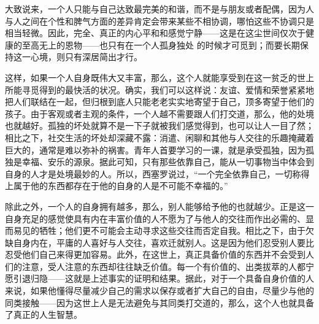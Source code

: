 \documentclass[11pt,oneside]{article}
\begin{document}
\begin{common-format}
大致说来，一个人只能与自己达致最完美的和谐，而不是与朋友或者配偶，因为人与人之间在个性和脾气方面的差异肯定会带来某些不相协调，哪怕这些不协调只是相当轻微。因此，完全、真正的内心平和和感觉宁静——这是在这尘世间仅次于健康的至高无上的恩物——也只有在一个人孤身独处 的时候才可觅到；而要长期保持这一心境，则只有深居简出才行。 

这样，如果一个人自身既伟大又丰富，那么，这个人就能享受到在这一贫乏的世上所能寻觅得到的最快活的状况。确实，我们可以这样说：友谊、爱情和荣誉紧紧地把人们联结在一起，但归根到底人只能老老实实地寄望于自己，顶多寄望于他们的孩子。由于客观或者主观的条件，一个人越不需要跟人们打交道，那么，他的处境也就越好。孤独的坏处就算不是一下子就被我们感觉得到，也可以让人一目了然；相比之下，社交生活的坏处却深藏不露：消遣、闲聊和其他与人交往的乐趣掩藏着巨大的，通常是难以弥补的祸害。青年人首要学习的一课，就是承受孤独，因为孤独是幸福、安乐的源泉。据此可知，只有那些依靠自己，能从一切事物当中体会到自身的人才是处境最妙的人。所以，西塞罗说过，“一个完全依靠自己，一切称得上属于他的东西都存在于他的自身的人是不可能不幸福的。” 

除此之外，一个人的自身拥有越多，那么，别人能够给予他的也就越少。正是这一自身充足的感觉使具有内在丰富价值的人不愿为了与他人的交往而作出必需的、显而易见的牺牲；他们更不可能会主动寻求这些交往而否定自我。相比之下，由于欠缺自身内在，平庸的人喜好与人交往，喜欢迁就别人。这是因为他们忍受别人要比忍受他们自己来得更加容易。此外，在这世上，真正具备价值的东西并不会受到人们的注意，受人注意的东西却往往缺乏价值。每一个有价值的、出类拔萃的人都宁愿引退归隐——这就是上述事实的证明和结果。据此，对于一个具备自身价值的人来说，如果他懂得尽量减少自己的需求以保存或者扩大自己的自由，尽量少与他的同类接触——因为这世上人是无法避免与其同类打交道的，那么，这个人也就具备了真正的人生智慧。 


\end{common-format}
\end{document}
